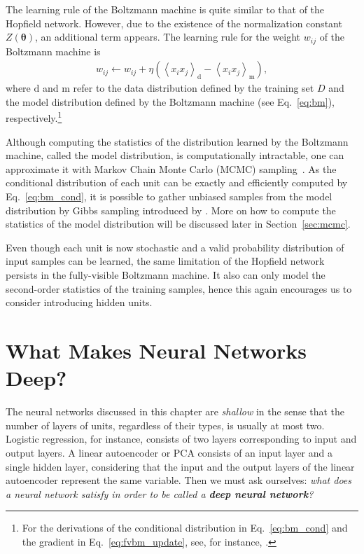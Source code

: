 \documentclass{now}
\newcommand{\vects}[1]{\boldsymbol{#1}}
\newcommand{\td}[0]{\text{d}}
\newcommand{\tf}[0]{\text{m}}
\newcommand{\TT}[0]{{\vects{\theta}}}
\begin{document}
The learning rule of the Boltzmann machine is quite similar to that of the
Hopfield network. However, due to the existence of the normalization constant
$Z(\TT)$, an additional term appears. The learning rule for the weight $w_{ij}$
of the Boltzmann machine is
\begin{align}
    \label{eq:fvbm_update}
    w_{ij} \leftarrow w_{ij} + \eta \left( \left< x_i
    x_j\right>_\td - \left< x_i x_j \right>_\tf \right),
\end{align}
where $\td$ and $\tf$ refer to the data distribution defined by the training set
$D$ and the model distribution defined by the Boltzmann machine (see
Eq.~\eqref{eq:bm}), respectively.\footnote{
For the derivations of the conditional distribution in Eq.~\eqref{eq:bm_cond}
and the gradient in Eq.~\eqref{eq:fvbm_update}, see, for instance, \citep{Cho2011t}.
}

Although computing the statistics of the distribution learned by the Boltzmann
machine, called the model distribution, is computationally intractable, one can
approximate it with Markov Chain Monte Carlo (MCMC) sampling~\citep[see, e.g.,][]{Neal1993}.
As the conditional distribution of each unit can be exactly and efficiently
computed by Eq.~\eqref{eq:bm_cond}, it is possible to gather unbiased samples
from the model distribution by Gibbs sampling introduced by \citet{Geman1984}.
More on how to compute the statistics of the model distribution will be
discussed later in Section~\ref{sec:mcmc}.

Even though each unit is now stochastic and a valid probability distribution of
input samples can be learned, the same limitation of the Hopfield network
persists in the fully-visible Boltzmann machine. It also can only model the
second-order statistics of the training samples, hence this again encourages us
to consider introducing hidden units.

\section{What Makes Neural Networks Deep?}
\label{sec:deep_conditions}

The neural networks discussed in this chapter are \textit{shallow} in the sense
that the number of layers of units, regardless of their types, is usually at
most two.  Logistic regression, for instance, consists of two layers
corresponding to input and output layers. A linear autoencoder or PCA consists
of an input layer and a single hidden layer, considering that the input and the
output layers of the linear autoencoder represent the same variable. Then we
must ask ourselves: \textit{what does a neural network satisfy in order to be
    called a \textbf{deep neural network}?}
\end{document}
